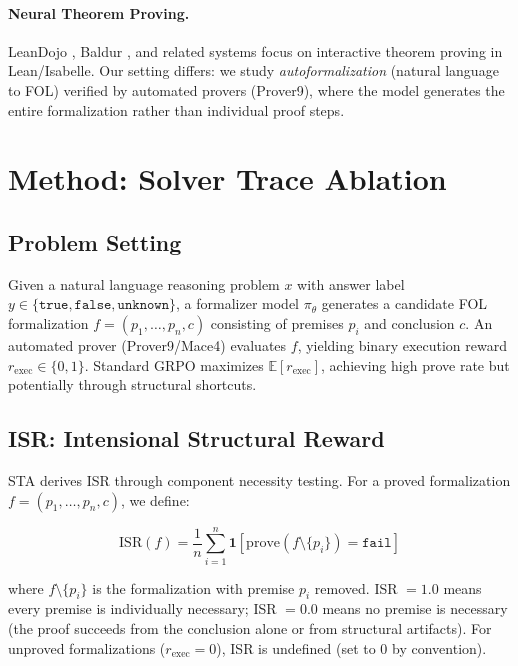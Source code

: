 \documentclass[11pt,a4paper]{article}
\begin{document}
\paragraph{Neural Theorem Proving.}
LeanDojo \cite{yang2023leandojo}, Baldur \cite{first2023baldur}, and related systems focus on interactive theorem proving in Lean/Isabelle.
Our setting differs: we study \emph{autoformalization} (natural language to FOL) verified by automated provers (Prover9), where the model generates the entire formalization rather than individual proof steps.

\section{Method: Solver Trace Ablation}

\subsection{Problem Setting}

Given a natural language reasoning problem $x$ with answer label $y \in \{\texttt{true}, \texttt{false}, \texttt{unknown}\}$, a formalizer model $\pi_\theta$ generates a candidate FOL formalization $f = (p_1, \ldots, p_n, c)$ consisting of premises $p_i$ and conclusion $c$.
An automated prover (Prover9/Mace4) evaluates $f$, yielding binary execution reward $r_{\text{exec}} \in \{0, 1\}$.
Standard GRPO maximizes $\mathbb{E}[r_{\text{exec}}]$, achieving high prove rate but potentially through structural shortcuts.

\subsection{ISR: Intensional Structural Reward}

STA derives ISR through component necessity testing.
For a proved formalization $f = (p_1, \ldots, p_n, c)$, we define:

\begin{equation}
\text{ISR}(f) = \frac{1}{n} \sum_{i=1}^{n} \mathbf{1}\left[\text{prove}(f \setminus \{p_i\}) = \texttt{fail}\right]
\label{eq:isr}
\end{equation}

where $f \setminus \{p_i\}$ is the formalization with premise $p_i$ removed.
ISR $= 1.0$ means every premise is individually necessary; ISR $= 0.0$ means no premise is necessary (the proof succeeds from the conclusion alone or from structural artifacts).
For unproved formalizations ($r_{\text{exec}} = 0$), ISR is undefined (set to 0 by convention).
\end{document}

